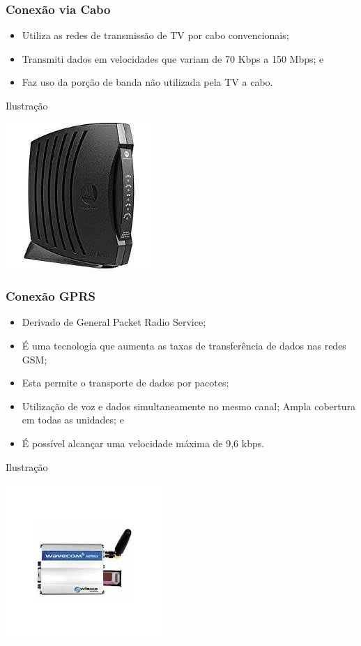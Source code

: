 \documentclass[aspectratio=169]{beamer} %
\begin{document}
\begin{frame}
	\frametitle{Conexão via Cabo}
			
	\begin{itemize}
		\item Utiliza as redes de transmissão de TV por cabo convencionais;
		\item Transmiti dados em velocidades que variam de 70 Kbps a 150 Mbps; e
		\item Faz uso da porção de banda não utilizada pela TV a cabo.
	\end{itemize}\vfill
	
	\begin{exampleblock}{Ilustra\c cão}
		\begin{center}
			\includegraphics[scale=0.4]{img/modem-cabo}
		\end{center}
	\end{exampleblock}
\end{frame}

\begin{frame}
	\frametitle{Conexão GPRS}
			
	\begin{itemize}
		\item Derivado de General Packet Radio Service;
		\item É uma tecnologia que aumenta as taxas de transferência de dados nas redes GSM;
		\item Esta permite o transporte de dados por pacotes;
		\item Utilização de voz e dados simultaneamente no mesmo canal; Ampla cobertura em todas as unidades; e
		\item É possível alcançar uma velocidade máxima de 9,6 kbps.
	\end{itemize}\vfill
	
	\begin{exampleblock}{Ilustra\c cão}
		\begin{center}
			\includegraphics[scale=0.4]{img/modem-gprs}
		\end{center}
	\end{exampleblock}
\end{frame}
\end{document}
